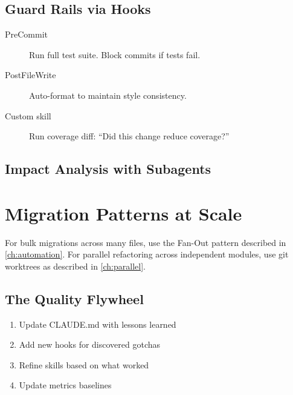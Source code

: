 \subsection{Guard Rails via Hooks}


\begin{description}
  \item[PreCommit] Run full test suite. Block commits if tests fail.
  \item[PostFileWrite] Auto-format to maintain style consistency.
  \item[Custom skill] Run coverage diff: ``Did this change reduce coverage?''
\end{description}

\subsection{Impact Analysis with Subagents}


\section{Migration Patterns at Scale}
\label{sec:migrations}

For bulk migrations across many files, use the Fan-Out pattern
described in \cref{ch:automation}. For parallel refactoring across
independent modules, use git worktrees as described in \cref{ch:parallel}.

\subsection{The Quality Flywheel}


\begin{enumerate}
  \item Update CLAUDE.md with lessons learned
  \item Add new hooks for discovered gotchas
  \item Refine skills based on what worked
  \item Update metrics baselines
\end{enumerate}

